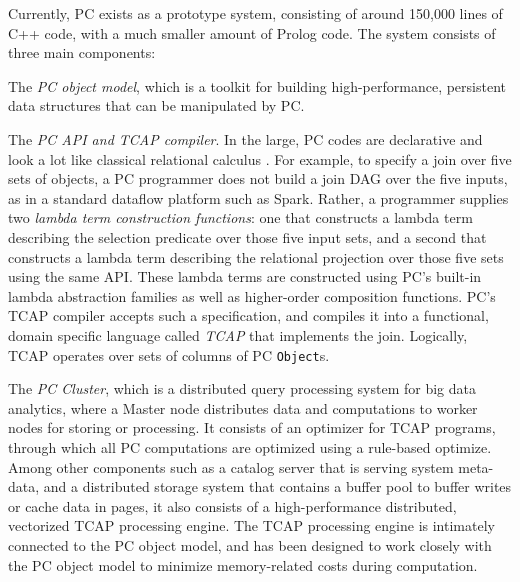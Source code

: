 Currently, PC exists as a prototype system, consisting of around
150,000 lines of C++ code, with a much smaller amount of Prolog code.
The system consists of three main components: 

\vspace{8pt}
\noindent
The \emph{PC object model}, which is a toolkit for building high-performance, persistent data structures that can be 
manipulated by PC.  

\vspace {5pt}
\noindent
The \emph{PC API and TCAP compiler}.  In the large, PC codes are declarative and look a lot like classical relational calculus \cite{codd1971data}.  For example, to specify a join over five sets of objects, a PC programmer does not build a join DAG over the five inputs, as in a standard
dataflow platform such as Spark.  Rather, a programmer 
supplies two \emph{lambda term construction functions}: one that constructs a lambda term describing the selection
predicate over those five input sets, 
and a second that constructs a lambda term describing the relational projection over those five sets
using the same API.  These lambda terms are constructed using PC's built-in lambda abstraction families as well as higher-order composition functions.
 PC's TCAP compiler 
accepts such a specification, and compiles it into a functional, domain specific language called \emph{TCAP} that implements
the join.  Logically, TCAP operates over
sets of columns of PC \texttt{Object}s. 

\vspace{5pt}
\noindent
The \emph{PC Cluster}, which is a distributed query processing
  system for big data analytics, where a Master node distributes data
  and computations to worker nodes for storing or processing. It consists of an optimizer for TCAP
  programs, through which all PC computations are optimized using a rule-based
optimize. Among other components such as a catalog server that is
serving system meta-data, and a
distributed storage system that
contains a buffer pool to buffer writes or cache data in pages, it also consists of a
high-performance distributed, vectorized TCAP processing engine. 
The TCAP processing engine is intimately connected to the PC object model, 
and has been designed to work closely with the PC object model to
minimize memory-related costs during computation.




